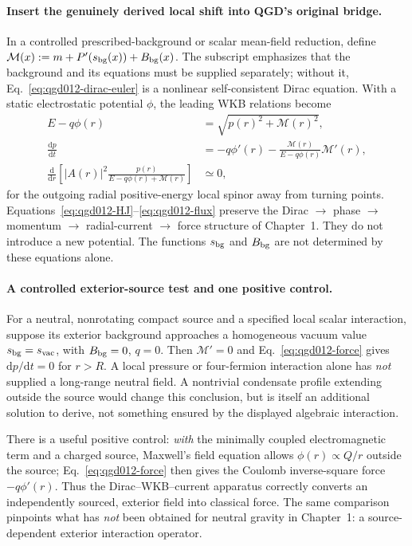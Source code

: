 \documentclass[11pt,a4paper]{article}
\newcommand{\dd}{\mathrm d}
\begin{document}
\paragraph{Insert the genuinely derived local shift into QGD's original bridge.}
In a controlled prescribed-background or scalar mean-field reduction, define $\mathcal M(x):=m+P'(s_{\rm bg}(x))+B_{\rm bg}(x)$. The subscript emphasizes that the background and its equations must be supplied separately; without it, Eq.~\eqref{eq:qgd012-dirac-euler} is a nonlinear self-consistent Dirac equation. With a static electrostatic potential $\phi$, the leading WKB relations become
\begin{align}
 E-q\phi(r)&=\sqrt{p(r)^2+\mathcal M(r)^2},\label{eq:qgd012-HJ}\\
 \frac{\dd p}{\dd t}&=-q\phi'(r)-\frac{\mathcal M(r)}{E-q\phi(r)}\mathcal M'(r),\label{eq:qgd012-force}\\
 \frac{\dd}{\dd r}\!\left[|A(r)|^2\frac{p(r)}{E-q\phi(r)+\mathcal M(r)}\right]&\simeq0,\label{eq:qgd012-flux}
\end{align}
for the outgoing radial positive-energy local spinor away from turning points. Equations~\eqref{eq:qgd012-HJ}--\eqref{eq:qgd012-flux} preserve the Dirac $\to$ phase $\to$ momentum $\to$ radial-current $\to$ force structure of Chapter~1. They do not introduce a new potential. The functions $s_{\rm bg}$ and $B_{\rm bg}$ are not determined by these equations alone.

\paragraph{A controlled exterior-source test and one positive control.}
For a neutral, nonrotating compact source and a specified local scalar interaction, suppose its exterior background approaches a homogeneous vacuum value $s_{\rm bg}=s_{\rm vac}$, with $B_{\rm bg}=0$, $q=0$. Then $\mathcal M'=0$ and Eq.~\eqref{eq:qgd012-force} gives $\dd p/\dd t=0$ for $r>R$. A local pressure or four-fermion interaction alone has \emph{not} supplied a long-range neutral field. A nontrivial condensate profile extending outside the source would change this conclusion, but is itself an additional solution to derive, not something ensured by the displayed algebraic interaction.

There is a useful positive control: \emph{with} the minimally coupled electromagnetic term and a charged source, Maxwell's field equation allows $\phi(r)\propto Q/r$ outside the source; Eq.~\eqref{eq:qgd012-force} then gives the Coulomb inverse-square force $-q\phi'(r)$. Thus the Dirac--WKB--current apparatus correctly converts an independently sourced, exterior field into classical force. The same comparison pinpoints what has \emph{not} been obtained for neutral gravity in Chapter~1: a source-dependent exterior interaction operator.
\end{document}

